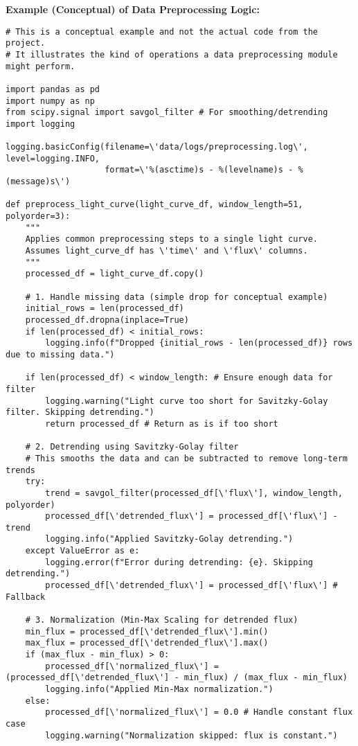 \documentclass{article}
\begin{document}
\textbf{Example (Conceptual) of Data Preprocessing Logic:}
\begin{lstlisting}[caption={Conceptual Data Preprocessing Logic}]
# This is a conceptual example and not the actual code from the project.
# It illustrates the kind of operations a data preprocessing module might perform.

import pandas as pd
import numpy as np
from scipy.signal import savgol_filter # For smoothing/detrending
import logging

logging.basicConfig(filename=\'data/logs/preprocessing.log\', level=logging.INFO,
                    format=\'%(asctime)s - %(levelname)s - %(message)s\')

def preprocess_light_curve(light_curve_df, window_length=51, polyorder=3):
    """
    Applies common preprocessing steps to a single light curve.
    Assumes light_curve_df has \'time\' and \'flux\' columns.
    """
    processed_df = light_curve_df.copy()

    # 1. Handle missing data (simple drop for conceptual example)
    initial_rows = len(processed_df)
    processed_df.dropna(inplace=True)
    if len(processed_df) < initial_rows:
        logging.info(f"Dropped {initial_rows - len(processed_df)} rows due to missing data.")

    if len(processed_df) < window_length: # Ensure enough data for filter
        logging.warning("Light curve too short for Savitzky-Golay filter. Skipping detrending.")
        return processed_df # Return as is if too short

    # 2. Detrending using Savitzky-Golay filter
    # This smooths the data and can be subtracted to remove long-term trends
    try:
        trend = savgol_filter(processed_df[\'flux\'], window_length, polyorder)
        processed_df[\'detrended_flux\'] = processed_df[\'flux\'] - trend
        logging.info("Applied Savitzky-Golay detrending.")
    except ValueError as e:
        logging.error(f"Error during detrending: {e}. Skipping detrending.")
        processed_df[\'detrended_flux\'] = processed_df[\'flux\'] # Fallback

    # 3. Normalization (Min-Max Scaling for detrended flux)
    min_flux = processed_df[\'detrended_flux\'].min()
    max_flux = processed_df[\'detrended_flux\'].max()
    if (max_flux - min_flux) > 0:
        processed_df[\'normalized_flux\'] = (processed_df[\'detrended_flux\'] - min_flux) / (max_flux - min_flux)
        logging.info("Applied Min-Max normalization.")
    else:
        processed_df[\'normalized_flux\'] = 0.0 # Handle constant flux case
        logging.warning("Normalization skipped: flux is constant.")


\end{lstlisting}
\end{document}
